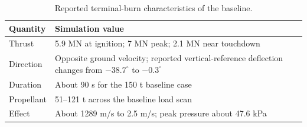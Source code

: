 \begin{table}[htbp]
\caption{Reported terminal-burn characteristics of the baseline.}
\label{tab:src8}
\small
\setlength{\tabcolsep}{3.5pt}
\begin{tabularx}{\linewidth}{@{}p{.22\linewidth}X@{}}
\toprule
Quantity & Simulation value \\
\midrule
Thrust & 5.9 MN at ignition; 7 MN peak; 2.1 MN near touchdown \\
Direction & Opposite ground velocity; reported vertical-reference deflection changes from $-38.7^\circ$ to $-0.3^\circ$ \\
Duration & About 90 s for the 150 t baseline case \\
Propellant & 51--121 t across the baseline load scan \\
Effect & About 1289 m/s to 2.5 m/s; peak pressure about 47.6 kPa \\
\bottomrule
\end{tabularx}
\par{}
\end{table}
